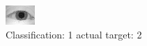 \begin{figure}[h!]
\begin{center}
\includegraphics[width=0.60\columnwidth]{figures/ID974_class_1_target_2.png}
\end{center}
\caption{ Classification: 1 actual target: 2}
\label{fig:ID974_class_1_target_2}
\end{figure}
